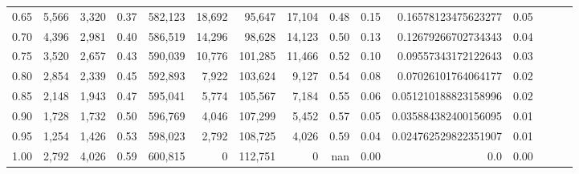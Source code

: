 \begin{tabular}{rrrrrrrrrrrrrrr}
0.65 &    5,566 &   3,320 &  0.37 &  582,123 &   18,692 &   95,647 &   17,104 &  0.48 &  0.15 &   0.16578123475623277 &      0.05 \\
0.70 &    4,396 &   2,981 &  0.40 &  586,519 &   14,296 &   98,628 &   14,123 &  0.50 &  0.13 &   0.12679266702734343 &      0.04 \\
0.75 &    3,520 &   2,657 &  0.43 &  590,039 &   10,776 &  101,285 &   11,466 &  0.52 &  0.10 &   0.09557343172122643 &      0.03 \\
0.80 &    2,854 &   2,339 &  0.45 &  592,893 &    7,922 &  103,624 &    9,127 &  0.54 &  0.08 &   0.07026101764064177 &      0.02 \\
0.85 &    2,148 &   1,943 &  0.47 &  595,041 &    5,774 &  105,567 &    7,184 &  0.55 &  0.06 &  0.051210188823158996 &      0.02 \\
0.90 &    1,728 &   1,732 &  0.50 &  596,769 &    4,046 &  107,299 &    5,452 &  0.57 &  0.05 &  0.035884382400156095 &      0.01 \\
0.95 &    1,254 &   1,426 &  0.53 &  598,023 &    2,792 &  108,725 &    4,026 &  0.59 &  0.04 &  0.024762529822351907 &      0.01 \\
1.00 &    2,792 &   4,026 &  0.59 &  600,815 &        0 &  112,751 &        0 &   nan &  0.00 &                   0.0 &      0.00 \\
\bottomrule
\end{tabular}
